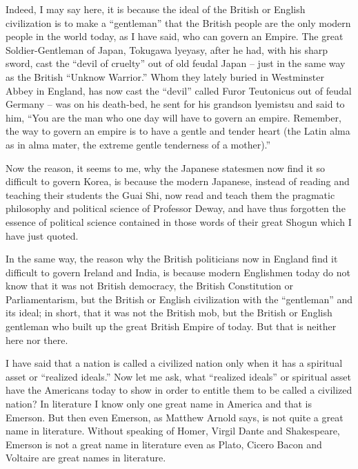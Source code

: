 Indeed, I may say here, it is because the ideal of the British or English civilization is to make a ``gentleman'' that the British people are the only modern people in the world today,
as I have said, who can govern an Empire. The great Soldier-Gentleman of Japan, Tokugawa lyeyasy,
after he had, with his sharp sword, cast the ``devil of cruelty'' out of old feudal Japan
-- just in the same way as the British ``Unknow Warrior.''
Whom they lately buried in Westminster Abbey in England,
has now cast the ``devil'' called Furor Teutonicus out of feudal Germany
-- was on his death-bed, he sent for his grandson lyemistsu and said to him,
``You are the man who one day will have to govern an empire.
Remember, the way to govern an empire is to have a gentle and tender heart
(the Latin alma as in alma mater, the extreme gentle tenderness of a mother).''

Now the reason, it seems to me, why the Japanese statesmen now find it so difficult to govern Korea,
is because the modern Japanese,
instead of reading and teaching their students the Guai Shi,
now read and teach them the pragmatic philosophy and political science of Professor Deway,
and have thus forgotten the essence of political science contained in those words of their great Shogun which I have just quoted.

In the same way, the reason why the British politicians now in England find it difficult to govern Ireland and India,
is because modern Englishmen today do not know that it was not British democracy,
the British Constitution or Parliamentarism,
but the British or English civilization with the ``gentleman'' and its ideal;
in short, that it was not the British mob, but the British or English gentleman who built up the great British Empire of today. But that is neither here nor there.

I have said that a nation is called a civilized nation only when it has a spiritual asset or ``realized ideals.''
Now let me ask, what ``realized ideals'' or spiritual asset have the Americans today to show in order to entitle them to be called a civilized nation?
In literature I know only one great name in America and that is Emerson.
But then even Emerson, as Matthew Arnold says, is not quite a great name in literature.
Without speaking of Homer, Virgil Dante and Shakespeare, Emerson is not a great name in literature even as Plato, Cicero Bacon and Voltaire are great names in literature.

